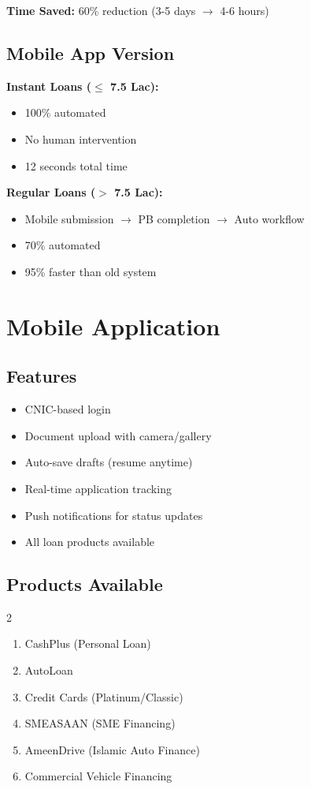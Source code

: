 \documentclass[11pt,a4paper]{article}
\begin{document}
\textbf{Time Saved:} 60\% reduction (3-5 days $\rightarrow$ 4-6 hours)

\subsection{Mobile App Version}

\textbf{Instant Loans ($\leq$ 7.5 Lac):}
\begin{itemize}[leftmargin=*]
    \item 100\% automated
    \item No human intervention
    \item 12 seconds total time
\end{itemize}

\textbf{Regular Loans ($>$ 7.5 Lac):}
\begin{itemize}[leftmargin=*]
    \item Mobile submission $\rightarrow$ PB completion $\rightarrow$ Auto workflow
    \item 70\% automated
    \item 95\% faster than old system
\end{itemize}

\newpage

\section{Mobile Application}

\subsection{Features}
\begin{itemize}[leftmargin=*]
    \item CNIC-based login
    \item Document upload with camera/gallery
    \item Auto-save drafts (resume anytime)
    \item Real-time application tracking
    \item Push notifications for status updates
    \item All loan products available
\end{itemize}

\subsection{Products Available}
\begin{multicols}{2}
\begin{enumerate}[leftmargin=*,noitemsep]
    \item CashPlus (Personal Loan)
    \item AutoLoan
    \item Credit Cards (Platinum/Classic)
    \item SMEASAAN (SME Financing)
    \item AmeenDrive (Islamic Auto Finance)
    \item Commercial Vehicle Financing
\end{enumerate}
\end{multicols}
\end{document}
